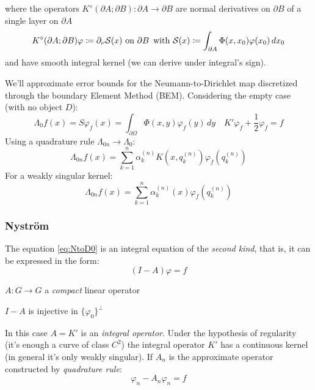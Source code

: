 \documentclass[10pt, a4paper, twoside, openright]{book}
\theoremstyle{definition}
\theoremstyle{plain}
\theoremstyle{plain}
\theoremstyle{plain}
\theoremstyle{plain}
\theoremstyle{plain}
\theoremstyle{plain}
\theoremstyle{plain}
\theoremstyle{plain}
\let\phi\varphi
\begin{document}
where the operators $K^\diamond(\partial A;\partial B):\partial A\to\partial B$ are normal derivatives on $\partial B$ of a single layer on $\partial A$
\begin{equation}
 K^\diamond(\partial A;\partial B)\phi\coloneqq \partial_\nu \mathcal{S}(x)\textup{ on }\partial B\,\textup{ with }
 \mathcal{S}(x)\coloneqq \int_{\partial A}\Phi(x,x_0)\phi(x_0)\,dx_0
\end{equation}
and have smooth integral kernel (we can derive under integral's sign).

\par
We'll approximate error bounds for the Neumann-to-Dirichlet map discretized through the boundary Element Method (BEM).
Considering the empty case (with no object $D$):
\begin{equation}
 \label{eq:NtoD0}
 \Lambda_0 f (x)= S\phi_f(x)=\int_{\partial\Omega}\Phi(x,y)\phi_f(y)\,dy \quad K'\phi_f+\frac{1}{2}\phi_f= f
\end{equation}
Using a quadrature rule $\Lambda_{0n} \to \Lambda_0$:
\begin{equation}
 \Lambda_{0n}f(x) = \sum_{k=1}^n\alpha_k^{(n)}K(x,q_k^{(n)})\phi_f(q_k^{(n)})
\end{equation}
For a weakly singular kernel:
\begin{equation}
 \Lambda_{0n}f(x) = \sum_{k=1}^n\alpha_k^{(n)}(x)\phi_f(q_k^{(n)})
\end{equation}

\par
\subsubsection{Nystr\"om}
The equation \eqref{eq:NtoD0} is an integral equation of the \textit{second kind}, that is, it can be expressed in the form:
\begin{equation}
 (I - A) \phi = f
\end{equation}
\begin{center}
 $A: G \to G$ a \textit{compact} linear operator
\end{center}
\begin{center}
 $I-A$ is injective in $\{\phi_0\}^\perp$
\end{center}

In this case $A=K'$ is an \textit{integral operator}.
Under the hypothesis of regularity (it's enough a curve of class $C^2$) the integral operator $K'$ has a continuous kernel (in general it's only weakly singular).
If $A_n$ is the approximate operator constructed by \textit{quadrature rule}:
\begin{equation}
 \phi_n - A_n\phi_n = f
\end{equation}
\end{document}
